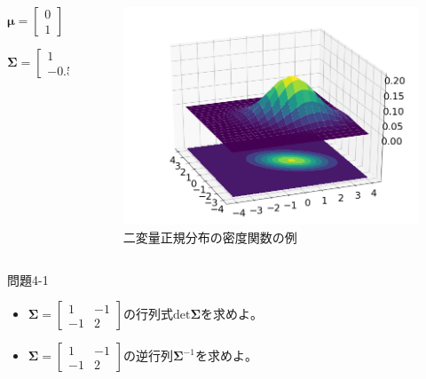 \documentclass[aspectratio=169,unicode,dvipdfmx,14pt]{beamer}
\begin{document}
\begin{frame}
\begin{columns}[c,onlytextwidth]
\begin{column}{.3\textwidth}
$\bm{\mu} = \begin{bmatrix} 0 \\ 1 \end{bmatrix}$

$\bm{\Sigma} = \begin{bmatrix} 1 & -0.5 \\ -0.5 & 1.5 \end{bmatrix}$
\end{column}
\begin{column}{.7\textwidth}
\begin{figure}[c]
\begin{center}
\includegraphics[scale=0.4]{normal_distribution_3.png}
\end{center}
\caption{二変量正規分布の密度関数の例}
\end{figure}
\end{column}
\end{columns}
\end{frame}

\begin{frame}{問題4-1}
\begin{itemize}
\item $\bm{\Sigma} = \begin{bmatrix} 1 & -1 \\ -1 & 2 \end{bmatrix}$の行列式$\mbox{det}\bm{\Sigma}$を求めよ。
\item $\bm{\Sigma} = \begin{bmatrix} 1 & -1 \\ -1 & 2 \end{bmatrix}$の逆行列$\bm{\Sigma}^{-1}$を求めよ。
\end{itemize}
\end{frame}
\end{document}
